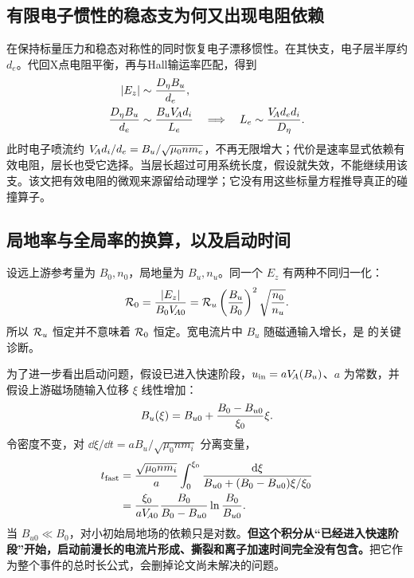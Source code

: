 \documentclass[UTF8,a4paper,11pt,openany,fontset=fandol]{ctexbook}
\begin{document}
\subsection{有限电子惯性的稳态支为何又出现电阻依赖}
\citet{Malyshkin2009}在保持标量压力和稳态对称性的同时恢复电子漂移惯性。在其快支，电子层半厚约 $d_e$。代回X点电阻平衡，再与Hall输运率匹配，得到
\begin{align}
|E_z|&\sim {D_\eta B_u\over d_e},\\
{D_\eta B_u\over d_e}&\sim{B_uV_{\!A}d_i\over L_e}
\quad\Longrightarrow\quad
L_e\sim {V_{\!A}d_ed_i\over D_\eta}.
\end{align}
此时电子喷流约 $V_{\!A} d_i/d_e=B_u/\sqrt{\mu_0nm_e}$，不再无限增大；代价是速率显式依赖有效电阻，层长也受它选择。当层长超过可用系统长度，假设就失效，不能继续用该支。该文把有效电阻的微观来源留给动理学；它没有用这些标量方程推导真正的碰撞算子。

\subsection{局地率与全局率的换算，以及启动时间}
设远上游参考量为 $B_0,n_0$，局地量为 $B_u,n_u$。同一个 $E_z$ 有两种不同归一化：
\begin{equation}
\mathcal R_0={|E_z|\over B_0V_{\!A0}}
=\mathcal R_u\left({B_u\over B_0}\right)^2
\sqrt{n_0\over n_u}.
\end{equation}
所以 $\mathcal R_u$ 恒定并不意味着 $\mathcal R_0$ 恒定。宽电流片中 $B_u$ 随磁通输入增长，是 \citet{Shay2004} 的关键诊断。

为了进一步看出启动问题，假设已进入快速阶段，$u_{\rm in}=aV_{\!A}(B_u)$、$a$ 为常数，并假设上游磁场随输入位移 $\xi$ 线性增加：
\begin{equation}
B_u(\xi)=B_{u0}+{B_0-B_{u0}\over\xi_0}\xi.
\end{equation}
令密度不变，对 $\dd\xi/\dd t=aB_u/\sqrt{\mu_0nm_i}$ 分离变量，
\begin{align}
t_{\rm fast}&={\sqrt{\mu_0nm_i}\over a}
\int_0^{\xi_0}{\mathrm d\xi\over B_{u0}+(B_0-B_{u0})\xi/\xi_0}\\
&={\xi_0\over aV_{\!A0}}{B_0\over B_0-B_{u0}}
\ln{B_0\over B_{u0}}.
\end{align}
当 $B_{u0}\ll B_0$，对小初始局地场的依赖只是对数。\textbf{但这个积分从“已经进入快速阶段”开始，启动前漫长的电流片形成、撕裂和离子加速时间完全没有包含。}把它作为整个事件的总时长公式，会删掉论文尚未解决的问题。
\end{document}
